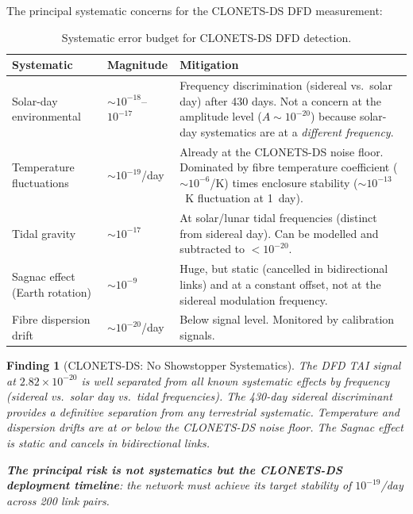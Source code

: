 \documentclass[11pt]{article}
\newtheorem{finding}{Finding}
\newcommand{\ee}[1]{\times 10^{#1}}
\begin{document}
The principal systematic concerns for the CLONETS-DS DFD measurement:

\begin{table}[H]
\centering
\caption{Systematic error budget for CLONETS-DS DFD detection.}
\label{tab:systematics}
\begin{tabular}{p{3.5cm}p{2.5cm}p{5cm}}
\toprule
\textbf{Systematic} & \textbf{Magnitude} & \textbf{Mitigation} \\
\midrule
Solar-day environmental & $\sim 10^{-18}$--$10^{-17}$ &
  Frequency discrimination (sidereal vs.\ solar day) after 430 days.
  Not a concern at the amplitude level ($A \sim 10^{-20}$) because
  solar-day systematics are at a \emph{different frequency}. \\
Temperature fluctuations & $\sim 10^{-19}$/day &
  Already at the CLONETS-DS noise floor. Dominated by fibre
  temperature coefficient ($\sim 10^{-6}$/K) times enclosure
  stability ($\sim 10^{-13}$~K fluctuation at 1~day). \\
Tidal gravity & $\sim 10^{-17}$ &
  At solar/lunar tidal frequencies (distinct from sidereal day).
  Can be modelled and subtracted to $< 10^{-20}$. \\
Sagnac effect (Earth rotation) & $\sim 10^{-9}$ &
  Huge, but static (cancelled in bidirectional links) and at a
  constant offset, not at the sidereal modulation frequency. \\
Fibre dispersion drift & $\sim 10^{-20}$/day &
  Below signal level. Monitored by calibration signals. \\
\bottomrule
\end{tabular}
\end{table}

\begin{finding}[CLONETS-DS: No Showstopper Systematics]
\label{find:no-systematics}
The DFD TAI signal at $2.82\ee{-20}$ is well separated from all known
systematic effects by frequency (sidereal vs.\ solar day vs.\ tidal
frequencies). The 430-day sidereal discriminant provides a definitive
separation from any terrestrial systematic. Temperature and dispersion
drifts are at or below the CLONETS-DS noise floor. The Sagnac effect
is static and cancels in bidirectional links.

\textbf{The principal risk is not systematics but the CLONETS-DS deployment
timeline}: the network must achieve its target stability of $10^{-19}$/day
across 200 link pairs.
\end{finding}

\end{document}
